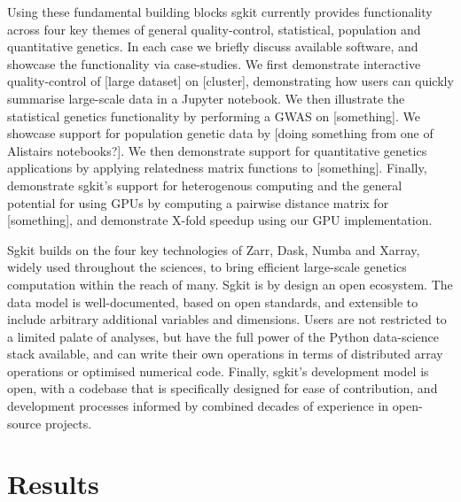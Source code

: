 \documentclass[9pt,lineno]{elife}
\begin{document}
Using these fundamental building blocks sgkit currently provides
functionality across four key themes of general quality-control,
statistical, population and quantitative genetics. In
each case we briefly discuss available software, and showcase
the functionality via case-studies.
We first demonstrate interactive quality-control of [large dataset]
on [cluster], demonstrating how users can quickly summarise
large-scale data in a Jupyter notebook. We then illustrate the
statistical genetics functionality by performing a GWAS
on [something]. We showcase support for
population genetic data by [doing something from one of Alistairs
notebooks?].
We then demonstrate support for quantitative genetics
applications by applying relatedness matrix functions to [something].
Finally, demonstrate sgkit's support for heterogenous computing
and the general potential for using GPUs by computing a
pairwise distance matrix for [something], and demonstrate
X-fold speedup using our GPU implementation.

Sgkit builds on the four key technologies of Zarr, Dask, Numba and Xarray,
widely used throughout the sciences, to bring efficient large-scale
genetics computation within the reach of many.
Sgkit is by design an open ecosystem.
The data model is well-documented,
based on open standards, and extensible to include arbitrary additional
variables and dimensions. Users are not restricted to a limited palate
of analyses, but have the full power of the Python data-science stack
available, and can write their own operations in terms of distributed
array operations or optimised numerical code. Finally, sgkit's
development model is open, with a codebase that is specifically
designed for ease of contribution,
and development processes informed
by combined decades of experience in open-source projects.


\section{Results}
\end{document}
